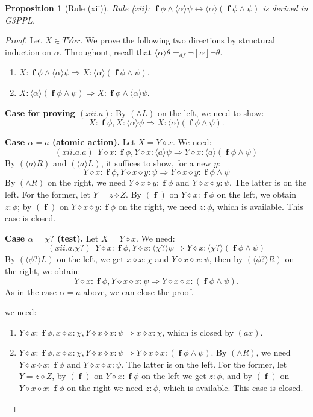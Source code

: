 \documentclass[manuscript,screen]{acmart}
\newtheorem{prop}{Proposition}[section]
\newcommand{\la}[0]{\langle}
\newcommand{\ra}[0]{\rangle}
\newcommand{\dddef}[0]{=_{df}}
\newcommand{\cat}[0]{\diamond}
\newcommand{\GiiiPPLcyc}[0]{\mbox{G3PPL}}
\DeclareMathOperator{\ofst}{\mathbf{f}}
\newcommand{\TVar}[0]{\textit{TVar}}
\begin{document}
\begin{prop}[Rule (xii)]
Rule (xii): 
$\ofst \phi\wedge \la\alpha\ra\psi\leftrightarrow \la\alpha\ra(\ofst\phi\wedge \psi)$
is derived in \GiiiPPLcyc. 
\end{prop}

\begin{proof}

Let $X\in\TVar$.
We prove the following two directions by structural induction on $\alpha$. Throughout, recall that $\la\alpha\ra\theta\dddef \neg[\alpha]\neg\theta$. 
\begin{enumerate}
\item[$(xii.a)$] $X : \ofst \phi\wedge \la\alpha\ra\psi\Rightarrow X : \la\alpha\ra(\ofst\phi\wedge \psi)$.
\item[$(xii.b)$] $X : \la\alpha\ra(\ofst\phi\wedge \psi)\Rightarrow X : \ofst \phi\wedge \la\alpha\ra\psi$.
\end{enumerate}

\textbf{Case for proving $(xii.a)$}: 
By $(\wedge L)$ on the left, we need to show:
$$
X : \ofst\phi, X : \la\alpha\ra\psi\Rightarrow X : \la\alpha\ra(\ofst\phi\wedge\psi). 
$$

\textbf{Case $\alpha = a$ (atomic action).} Let $X = Y\cat x$. We need:
$$
(xii.a.a)\ \ Y\cat x : \ofst\phi, Y\cat x : \la a\ra\psi\Rightarrow Y\cat x : \la a\ra(\ofst\phi\wedge\psi)
$$
By $(\la a\ra R)$ and $(\la a\ra L)$, it suffices to show, for a new $y$:
$$
Y\cat x : \ofst\phi, Y\cat x\cat y : \psi\Rightarrow Y\cat x\cat y : \ofst\phi\wedge\psi
$$
By $(\wedge R)$ on the right, we need $Y\cat x\cat y : \ofst\phi$ and $Y\cat x\cat y : \psi$. The latter is on the left. For the former, let $Y=z\cat Z$. By $(\ofst)$ on $Y\cat x : \ofst\phi$ on the left, we obtain $z : \phi$; by $(\ofst)$ on $Y\cat x\cat y : \ofst\phi$ on the right, we need $z : \phi$, which is available. This case is closed. 

\textbf{Case $\alpha = \chi?$ (test).} Let $X = Y\cat x$. We need:
$$
(xii.a.\chi?)\ \ Y\cat x : \ofst\phi, Y\cat x : \la\chi?\ra\psi\Rightarrow Y\cat x : \la\chi?\ra(\ofst\phi\wedge\psi)
$$
By $(\la\phi?\ra L)$ on the left, we get $x\cat x : \chi$ and $Y\cat x\cat x : \psi$, then by $(\la\phi?\ra R)$ on the right, we obtain:
$$
Y\cat x : \ofst \phi, Y\cat x\cat x : \psi\Rightarrow Y\cat x\cat x : (\ofst \phi\wedge \psi). 
$$
As in the case $\alpha=a$ above, we can close the proof. 

\ifx
we need:
\begin{enumerate}
    \item[(xii.a.$\chi?$.1)] $Y\cat x : \ofst\phi, x\cat x : \chi, Y\cat x\cat x : \psi\Rightarrow x\cat x : \chi$, which is closed by $(\textit{ax})$.
    \item[(xii.a.$\chi?$.2)] $Y\cat x : \ofst\phi, x\cat x : \chi, Y\cat x\cat x : \psi\Rightarrow Y\cat x\cat x : (\ofst\phi\wedge\psi)$. By $(\wedge R)$, we need $Y\cat x\cat x : \ofst\phi$ and $Y\cat x\cat x : \psi$. The latter is on the left. For the former, let $Y=z\cat Z$, by $(\ofst)$ on $Y\cat x : \ofst\phi$ on the left we get $z : \phi$, and by $(\ofst)$ on $Y\cat x\cat x : \ofst\phi$ on the right we need $z : \phi$, which is available. This case is closed.
\end{enumerate}
\fi


\end{proof}
\end{document}
